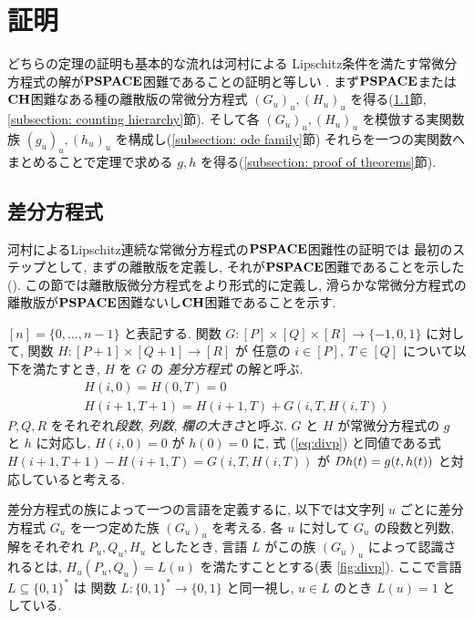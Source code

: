 \section{証明}
\label{section:differentiable}

どちらの定理の証明も基本的な流れは河村による
Lipschitz条件を満たす常微分方程式の解が$\mathbf{PSPACE}$困難であることの証明と等しい
\cite{kawamura2010lipschitz}.
まず$\mathbf{PSPACE}$または$\mathbf{CH}$困難なある種の離散版の常微分方程式
$(G_u)_u, (H_u)_u$ を得る(\ref{section:divp}節, \ref{subsection: counting hierarchy}節).
そして各 $(G_u)_u, (H_u)_u$ を模倣する実関数族 $(g_u)_u, (h_u)_u$ を構成し(\ref{subsection: ode family}節)
それらを一つの実関数へまとめることで定理で求める $g, h$ を得る(\ref{subsection: proof of theorems}節).



\subsection{差分方程式}
\label{section:divp}

河村によるLipschitz連続な常微分方程式の$\mathbf{PSPACE}$困難性の証明では
最初のステップとして, まずの離散版を定義し, 
それが$\mathbf{PSPACE}$困難であることを示した(\cite[補題4.7]{kawamura2010lipschitz}).
この節では離散版微分方程式をより形式的に定義し,
滑らかな常微分方程式の離散版が$\mathbf{PSPACE}$困難ないし$\mathbf{CH}$困難であることを示す.

$[n] = \{0, \dots , n-1\}$ と表記する.
関数 $G \colon [P] \times [Q] \times [R] \to \{-1, 0, 1\}$ に対して,
関数 $H \colon [P + 1] \times [Q+1] \to [R]$ が
任意の $i \in [P],\ T \in [Q]$ について以下を満たすとき,
$H$ を $G$ の \emph{差分方程式} の解と呼ぶ.
\begin{gather}
   H(i, 0) = H(0, T) = 0 
\\
   H(i + 1, T + 1) = H(i+1, T) + G(i, T, H(i, T))  \label{eq:divp}
\end{gather}
$P, Q, R$ をそれぞれ\emph{段数}, \emph{列数}, \emph{欄の大きさ}と呼ぶ.
$G$ と $H$ が常微分方程式の $g$ と $h$ に対応し,
$H(i, 0) = 0$ が $h(0) = 0$ に,
式 (\ref{eq:divp}) と同値である式 $H(i + 1, T + 1) - H(i+1, T) = G(i, T, H(i, T))$
が $D h(t) = g(t, h(t))$ と対応していると考える.

差分方程式の族によって一つの言語を定義するに,
以下では文字列 $u$ ごとに差分方程式 $G _u$ を一つ定めた族 $(G _u) _u$ を考える. 
各 $u$ に対して $G_u$ の段数と列数, 解をそれぞれ $P_u, Q_u, H_u$ としたとき,
言語 $L$ がこの族 $(G_u)_u$ によって認識されるとは,
$H_u(P_u, Q_u) = L(u)$ を満たすこととする(表 \ref{fig:divp}).
ここで言語 $L \subseteq \{0, 1\} ^*$ は
関数 $L \colon \{0, 1\} ^* \to \{0, 1\}$ と同一視し, 
$u \in L$ のとき $L (u) = 1$ としている. 


